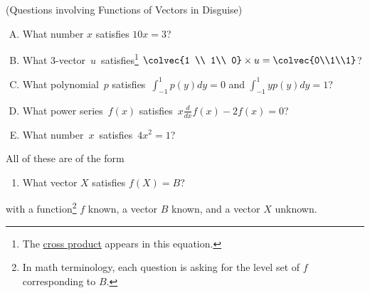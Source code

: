 \begin{example}  \label{EX}
(Questions involving Functions of Vectors in Disguise)\\
\begin{enumerate}[(A)]
\item\label{FVA}What number $x$ satisfies $10x=3$?
\item\label{FVB} What 3-vector~$u\!\, $  satisfies\footnote{ The \hyperlink{crossprod}{cross product} appears in this equation.}~$\!\colvec{1 \\ 1\\ 0} \times u = \colvec{0\\1\\1}$?\\[-.4cm]
\item \label{FVC}What polynomial~$p$ satisfies~$\int_{-1}^1  p(y) dy = 0$ and $\int_{-1}^1 y p(y) dy=1$?\\
\item \label{FVD}What power series~$f(x)$ satisfies~$x\frac{d}{dx} f(x) -2f(x)=0$?
\item What number~$x$~satisfies~$4 x^2=1$?
\end{enumerate}
\vspace{.3cm}
All of these are of the form 
\begin{enumerate}[($\star$)]
\item What vector $X$ satisfies $f(X)=B$?
\end{enumerate}
with a function\footnote{In math terminology, each question is asking for the level set of $f$ corresponding to $B$.} $f$ known, a vector $B$ known, and a vector $X$ unknown.
\end{example}
